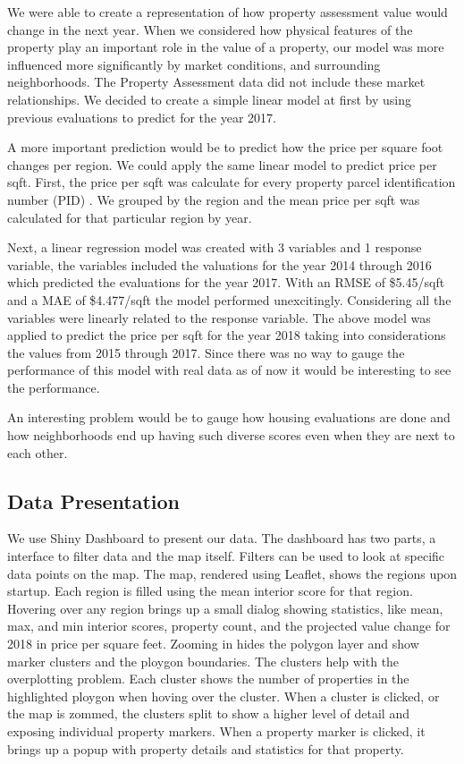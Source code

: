 \documentclass[12pt]{article}
\begin{document}
We were able to create a representation of how property assessment
value would change in the next year. When we considered how physical
features of the property play an important role in the value of a
property, our model was more influenced more significantly by market
conditions, and surrounding neighborhoods. The Property Assessment data
did not include these market relationships. We decided to create a
simple linear model at first by using previous evaluations to predict for
the year 2017.

A more important prediction would be to predict how the price per square 
foot changes per region. We could apply the same linear model to predict 
price per sqft. First, the price per sqft was calculate for every
property parcel identification number (PID) \cite{Property49:online}. We
grouped by the region and the mean price per sqft was calculated for that
particular region by year.

Next, a linear regression model was created with 3 variables and 1 
response variable, the variables included the valuations for the year 
2014 through 2016 which predicted the evaluations for the year 2017. With 
an RMSE of \$5.45/sqft and a MAE of \$4.477/sqft the model performed 
unexcitingly. Considering all the variables were linearly related to the 
response variable. The above model was applied to predict the price per
sqft for the year 2018 taking into considerations the values from 2015
through 2017. Since there was no way to gauge the performance of this
model with real data as of now it would be interesting to see the
performance.

An interesting problem would be to gauge how housing evaluations are done 
and how neighborhoods end up having such diverse scores even when they
are next to each other.

\subsection{Data Presentation}

We use Shiny Dashboard \cite{ShinyDas50:online} to present our data. The 
dashboard has two parts, a interface to filter data and the map itself. 
Filters can be used to look at specific data points on the map. The map,
rendered using Leaflet, shows the regions upon startup. Each region is
filled using the mean interior score for that region. Hovering over any
region brings up a small dialog showing statistics, like mean, max, and
min interior scores, property count, and the projected value change for
2018 in price per square feet. Zooming in hides the polygon layer and
show marker clusters and the ploygon boundaries. The clusters help with
the overplotting problem. Each cluster shows the number of properties in
the highlighted ploygon when hoving over the cluster. When a cluster is
clicked, or the map is zommed, the clusters split to show a higher level
of detail and exposing individual property markers. When a property
marker is clicked, it brings up a popup with property details and
statistics for that property.
\end{document}
